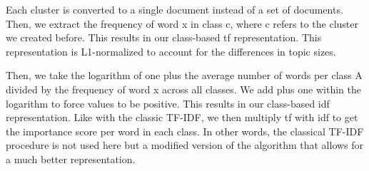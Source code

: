 Each cluster is converted to a single document instead of a set of documents. Then, we extract the frequency of word x in class c, where c refers to the cluster we created before. This results in our class-based tf representation. This representation is L1-normalized to account for the differences in topic sizes.

Then, we take the logarithm of one plus the average number of words per class A divided by the frequency of word x across all classes. We add plus one within the logarithm to force values to be positive. This results in our class-based idf representation. Like with the classic TF-IDF, we then multiply tf with idf to get the importance score per word in each class. In other words, the classical TF-IDF procedure is not used here but a modified version of the algorithm that allows for a much better representation.
